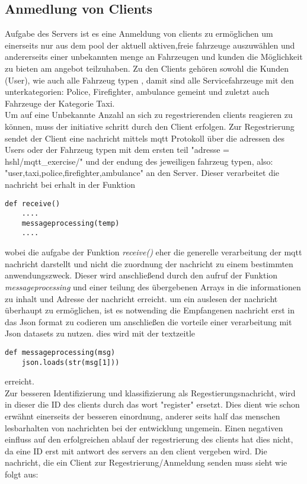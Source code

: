 \documentclass[conference]{IEEEtran}
\begin{document}
\subsection{Anmedlung von Clients}
Aufgabe des Servers ist es eine Anmeldung von clients zu ermöglichen um  einerseits nur aus dem pool der aktuell aktiven,freie fahrzeuge  auszuwählen und andererseits einer unbekannten menge an Fahrzeugen und kunden die Möglichkeit zu bieten am angebot teilzuhaben. Zu den Clients gehören sowohl die Kunden (User), wie auch alle Fahrzeug typen , damit sind alle Servicefahrzeuge mit den unterkategorien: Police, Firefighter, ambulance gemeint und zuletzt auch Fahrzeuge der Kategorie Taxi.\\ 
Um auf eine Unbekannte Anzahl an sich zu regestrierenden clients reagieren zu können, muss der initiative schritt durch den Client erfolgen. Zur Regestrierung sendet der Client eine nachricht mittels mqtt Protokoll über die adressen des Users oder der Fahrzeug typen mit dem ersten teil \textsf{"adresse = hshl/mqtt\_exercise/"} und der endung des jeweiligen fahrzeug typen, also: \textsf{"user,taxi,police,firefighter,ambulance"} an den Server. Dieser verarbeitet die nachricht bei erhalt in der Funktion  
\begin{lstlisting}
def receive()
	....
	messageprocessing(temp)
	....
\end{lstlisting}
 wobei die aufgabe der Funktion  \textit{receive()} eher die generelle verarbeitung der mqtt nachricht darstellt und nicht die zuordnung der nachricht zu einem bestimmten anwendungszweck. 
Dieser wird anschließend durch den aufruf der Funktion \textit{messageprocessing} und einer teilung des übergebenen Arrays in die informationen zu inhalt und Adresse der nachricht erreicht.
um ein auslesen der nachricht überhaupt zu ermöglichen, ist es notwending die Empfangenen nachricht erst in das Json format zu codieren um anschließen die vorteile einer verarbeitung mit Json datasets zu nutzen. dies wird mit der textzeitle \begin{lstlisting}
def messageprocessing(msg)
	json.loads(str(msg[1]))
\end{lstlisting}
 erreicht.\\
 Zur besseren Identifizierung und klassifizierung als Regestierungsnachricht, wird in dieser die ID des clients durch das wort "register" ersetzt. Dies dient wie schon erwähnt einerseits der besseren einordnung, anderer seits half das menschen lesbarhalten von nachrichten bei der entwicklung ungemein. Einen negativen einfluss auf den erfolgreichen ablauf der regestrierung des clients hat dies nicht, da eine ID erst mit antwort des servers an den client vergeben wird. Die nachricht, die ein Client zur Regestrierung/Anmeldung senden muss sieht wie folgt aus:
\end{document}
